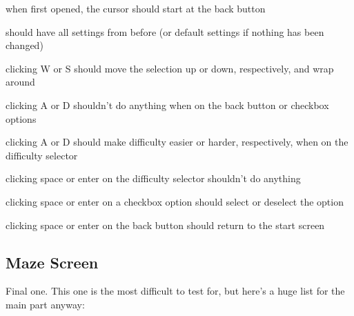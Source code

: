 \documentclass[11pt]{article} %
\begin{document}
\begin{compactitem}
	\item when first opened, the cursor should start at the back button
	\item should have all settings from before (or default settings if nothing has been changed)
	\item clicking W or S should move the selection up or down, respectively, and wrap around 
	\item clicking A or D shouldn't do anything when on the back button or checkbox options 
	\item clicking A or D should make difficulty easier or harder, respectively, when on the difficulty selector
	\item clicking space or enter on the difficulty selector shouldn't do anything
	\item clicking space or enter on a checkbox option should select or deselect the option
	\item clicking space or enter on the back button should return to the start screen 
\end{compactitem} 

\subsection{Maze Screen}
Final one. This one is the most difficult to test for, but here's a huge list for the main part anyway:
\end{document}
